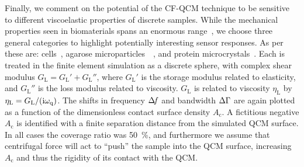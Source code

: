 Finally, we comment on the potential of the CF-QCM technique to be
sensitive to different viscoelastic properties of discrete samples.  While
the mechanical properties seen in biomaterials spans an enormous
range~\cite{meyers2008biological}, we choose three general categories to
highlight potentially interesting sensor responses.  As per
 these are: cells~\cite{li2008thickness}, agarose
microparticles~\cite{li2011surface}~\cite{patra2009viscoelastic}, and
protein microcrystals~\cite{zamiri2009modeling}.  Each is treated in the
finite element simulation as a discrete sphere, with complex shear modulus
$G_\mathrm{L}=G_\mathrm{L}'+G_\mathrm{L}''$, where $G_\mathrm{L}'$ is the
storage modulus related to elasticity, and $G_\mathrm{L}''$ is the loss
modulus related to viscosity.  $G_\mathrm{L}$ is related to viscosity
$\eta_\mathrm{L}$ by $\eta_\mathrm{L}=G_\mathrm{L}/({\mathrm{i}}\omega_\mathrm{q})$.  The
shifts in frequency $\Delta\!f$ and bandwidth $\Delta\Gamma$ are again plotted as a function of
the dimensionless contact surface density $A_\mathrm{c}$.
A fictitious negative $A_\mathrm{c}$
is identified with a finite separation distance from the
simulated QCM surface.  In all cases the coverage ratio was
\SI{50}{\percent}, and furthermore we assume that centrifugal force will act to
``push'' the sample into the QCM surface, increasing $A_\mathrm{c}$ and
thus the rigidity of its contact with the QCM.
